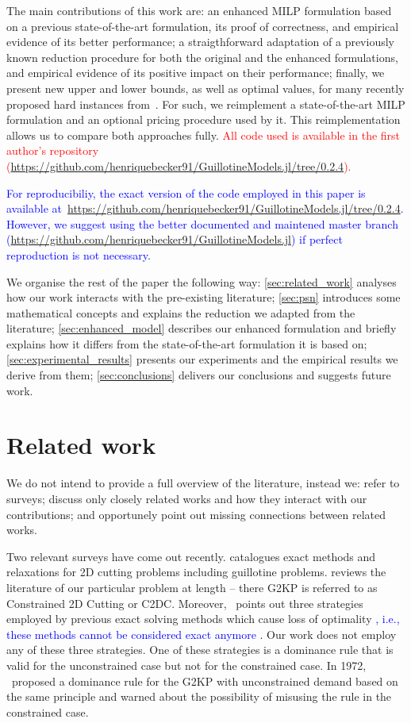 \documentclass[smallextended]{svjour3}       %
\newif\iffinalversion
\newcommand{\newtext}[1]{\iffinalversion%
#1%
\else%
\textcolor{blue}{#1}%
\fi%
}
\newcommand{\oldtext}[1]{\iffinalversion%
#1%
\else%
\textcolor{red}{#1}%
\fi%
}
\begin{document}
The main contributions of this work are:
an enhanced MILP formulation based on a previous state-of-the-art formulation, its proof of correctness, and empirical evidence of its better performance;
a straigthforward adaptation of a previously known reduction procedure for both the original and the enhanced formulations, and empirical evidence of its positive impact on their performance;
finally, we present new upper and lower bounds, as well as optimal values, for many recently proposed hard instances from~\cite{velasco:2019}.
For such, we reimplement a state-of-the-art MILP formulation and an optional pricing procedure used by it.
This reimplementation allows us to compare both approaches fully.
\oldtext{All code used is available in the first author's repository ({\small\url{https://github.com/henriquebecker91/GuillotineModels.jl/tree/0.2.4}}).}
\newtext{For reproducibiliy, the exact version of the code employed in this paper is available at~{\small\url{https://github.com/henriquebecker91/GuillotineModels.jl/tree/0.2.4}}. However, we suggest using the better documented and maintened master branch ({\small\url{https://github.com/henriquebecker91/GuillotineModels.jl}}) if perfect reproduction is not necessary.}

We organise the rest of the paper the following way:
\autoref{sec:related_work} analyses how our work interacts with the pre-existing literature;
\autoref{sec:psn} introduces some mathematical concepts and explains the reduction we adapted from the literature;
\autoref{sec:enhanced_model} describes our enhanced formulation and briefly explains how it differs from the state-of-the-art formulation it is based on;
\autoref{sec:experimental_results} presents our experiments and the empirical results we derive from them;
\autoref{sec:conclusions} delivers our conclusions and suggests future work.

\section{Related work}
\label{sec:related_work}

We do not intend to provide a full overview of the literature, instead we:
refer to surveys; discuss only closely related works and how they interact with our contributions; and opportunely point out missing connections between related works.

Two relevant surveys have come out recently.
\cite{iori:2020} catalogues exact methods and relaxations for 2D cutting problems including guillotine problems.
\cite{russo:2020} reviews the literature of our particular problem at length -- there G2KP is referred to as Constrained 2D Cutting or C2DC.
Moreover, \cite{russo:2020}~points out three strategies employed by previous exact solving methods which cause loss of optimality\newtext{, i.e., these methods cannot be considered exact anymore}.
Our work does not employ any of these three strategies.
One of these strategies is a dominance rule that is valid for the unconstrained case but not for the constrained case.
In 1972, \cite{herz:1972}~proposed a dominance rule for the G2KP with unconstrained demand based on the same principle and warned about the possibility of misusing the rule in the constrained case.
\end{document}
